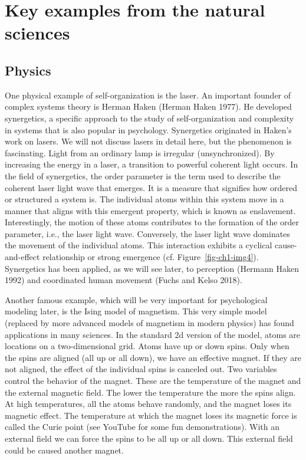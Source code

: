 \documentclass[
  a4paper,
  DIV=11,
  numbers=noendperiod,
  oneside]{scrreprt}
\begin{document}
\hypertarget{sec-Key-examples-from-the-natural-sciences}{%
\section{Key examples from the natural
sciences}\label{sec-Key-examples-from-the-natural-sciences}}

\hypertarget{sec-Physics}{%
\subsection{Physics}\label{sec-Physics}}

One physical example of self-organization is the laser. An important
founder of complex systems theory is Herman Haken (Herman Haken 1977).
He developed synergetics, a specific approach to the study of
self-organization and complexity in systems that is also popular in
psychology. Synergetics originated in Haken's work on lasers. We will
not discuss lasers in detail here, but the phenomenon is fascinating.
Light from an ordinary lamp is irregular (unsynchronized). By increasing
the energy in a laser, a transition to powerful coherent light occurs.
In the field of synergetics, the order parameter is the term used to
describe the coherent laser light wave that emerges. It is a measure
that signifies how ordered or structured a system is. The individual
atoms within this system move in a manner that aligns with this emergent
property, which is known as enslavement. Interestingly, the motion of
these atoms contributes to the formation of the order parameter, i.e.,
the laser light wave. Conversely, the laser light wave dominates the
movement of the individual atoms. This interaction exhibits a cyclical
cause-and-effect relationship or strong emergence (cf.
Figure~\ref{fig-ch1-img4}). Synergetics has been applied, as we will see
later, to perception (Hermann Haken 1992) and coordinated human movement
(Fuchs and Kelso 2018).

Another famous example, which will be very important for psychological
modeling later, is the Ising model of magnetism. This very simple model
(replaced by more advanced models of magnetism in modern physics) has
found applications in many sciences. In the standard 2d version of the
model, atoms are locations on a two-dimensional grid. Atoms have up or
down spins. Only when the spins are aligned (all up or all down), we
have an effective magnet. If they are not aligned, the effect of the
individual spins is canceled out. Two variables control the behavior of
the magnet. These are the temperature of the magnet and the external
magnetic field. The lower the temperature the more the spins align. At
high temperatures, all the atoms behave randomly, and the magnet loses
its magnetic effect. The temperature at which the magnet loses its
magnetic force is called the Curie point (see YouTube for some fun
demonstrations). With an external field we can force the spins to be all
up or all down. This external field could be caused another magnet.
\end{document}
